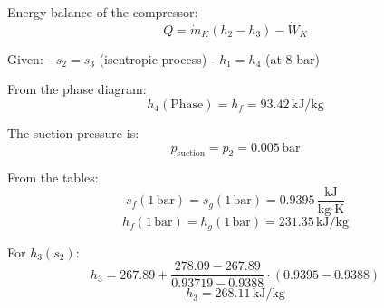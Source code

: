 Energy balance of the compressor:  
\[
Q = \dot{m}_K \left( h_2 - h_3 \right) - \dot{W}_K
\]

Given:  
- \( s_2 = s_3 \) (isentropic process)  
- \( h_1 = h_4 \) (at 8 bar)  

From the phase diagram:  
\[
h_4 (\text{Phase}) = h_f = 93.42 \, \text{kJ/kg}
\]

The suction pressure is:  
\[
p_{\text{suction}} = p_2 = 0.005 \, \text{bar}
\]

From the tables:  
\[
s_f (1 \, \text{bar}) = s_g (1 \, \text{bar}) = 0.9395 \, \frac{\text{kJ}}{\text{kg·K}}
\]
\[
h_f (1 \, \text{bar}) = h_g (1 \, \text{bar}) = 231.35 \, \text{kJ/kg}
\]

For \( h_3 (s_2) \):  
\[
h_3 = 267.89 + \frac{278.09 - 267.89}{0.93719 - 0.9388} \cdot (0.9395 - 0.9388)
\]
\[
h_3 = 268.11 \, \text{kJ/kg}
\]